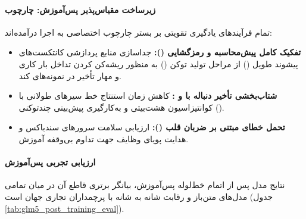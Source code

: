 \paragraph*{زیرساخت مقیاس‌پذیر پس‌آموزش: چارچوب }
تمام فرآیندهای یادگیری تقویتی بر بستر چارچوب اختصاصی  به اجرا درآمده‌اند:
\begin{itemize}
    \item \textbf{تفکیک کامل پیش‌محاسبه و رمزگشایی ():} جداسازی منابع پردازشی کانتکست‌های پیشوند طویل () از مراحل تولید توکن () به منظور ریشه‌کن کردن تداخل بار کاری و مهار تأخیر در نمونه‌های کند.
    \item \textbf{شتاب‌بخشی تأخیر دنباله با  و :} کاهش زمان استنتاج خط سیرهای طولانی با کوانتیزاسیون هشت‌بیتی و به‌کارگیری پیش‌بینی چندتوکنی ().
    \item \textbf{تحمل خطای مبتنی بر ضربان قلب ():} ارزیابی سلامت سرورهای سندباکس و هدایت پویای وظایف جهت تداوم بی‌وقفه آموزش.
\end{itemize}

\paragraph*{ارزیابی تجربی پس‌آموزش}
نتایج مدل  پس از اتمام خط‌لوله پس‌آموزش، بیانگر برتری قاطع آن در میان تمامی مدل‌های متن‌باز و رقابت شانه به شانه با پرچمداران تجاری جهان است (جدول \ref{tab:glm5_post_training_eval}).

